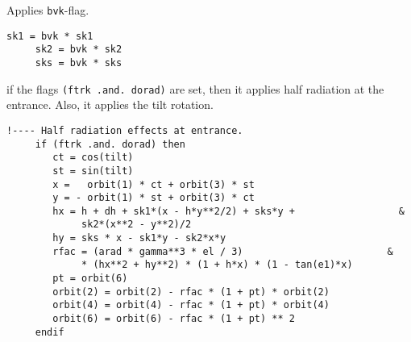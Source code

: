 \documentclass{cern-art} %
\renewcommand{\L}[1]{\lstinline[firstnumber=last]{#1}}
\begin{document}
Applies \L{bvk}-flag.
 \begin{lstlisting}[firstnumber=last]
     sk1 = bvk * sk1
     sk2 = bvk * sk2
     sks = bvk * sks
  \end{lstlisting}
  if the flags \L{(ftrk .and. dorad)} are set, then it applies half radiation at the entrance. Also, it applies the tilt rotation.
 \begin{lstlisting}[firstnumber=last]
     !---- Half radiation effects at entrance.
     if (ftrk .and. dorad) then
        ct = cos(tilt)
        st = sin(tilt)
        x =   orbit(1) * ct + orbit(3) * st
        y = - orbit(1) * st + orbit(3) * ct
        hx = h + dh + sk1*(x - h*y**2/2) + sks*y +                  &
             sk2*(x**2 - y**2)/2
        hy = sks * x - sk1*y - sk2*x*y
        rfac = (arad * gamma**3 * el / 3)                         &
             * (hx**2 + hy**2) * (1 + h*x) * (1 - tan(e1)*x)
        pt = orbit(6)
        orbit(2) = orbit(2) - rfac * (1 + pt) * orbit(2)
        orbit(4) = orbit(4) - rfac * (1 + pt) * orbit(4)
        orbit(6) = orbit(6) - rfac * (1 + pt) ** 2
     endif
  \end{lstlisting}


\end{document}
